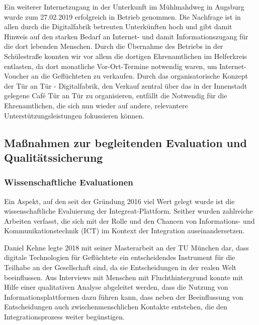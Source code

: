 \documentclass[12pt, a4paper]{article} %
\begin{document}
Ein weiterer Internetzugang in der Unterkunft im Mühlmahdweg in Augsburg
wurde zum 27.02.2019 erfolgreich in Betrieb genommen. Die Nachfrage ist
in allen durch die Digitalfabrik betreuten Unterkünften hoch und gibt
damit Hinweis auf den starken Bedarf an Internet- und damit
Informationszugang für die dort lebenden Menschen. Durch die Übernahme
des Betriebs in der Schülestraße konnten wir vor allem die dortigen
Ehrenamtlichen im Helferkreis entlasten, da dort monatliche
Vor-Ort-Termine notwendig waren, um Internet-Voucher an die Geflüchteten
zu verkaufen. Durch das organisatorische Konzept der Tür an Tür -
Digitalfabrik, den Verkauf zentral über das in der Innenstadt gelegene
Café Tür an Tür zu organisieren, entfällt die Notwendig für die
Ehrenamtlichen, die sich nun wieder auf andere, relevantere
Unterstützungsleistungen fokussieren können.

\hypertarget{mauxdfnahmen-zur-begleitenden-evaluation-und-qualituxe4tssicherung}{%
\subsection{Maßnahmen zur begleitenden Evaluation und
Qualitätssicherung}\label{mauxdfnahmen-zur-begleitenden-evaluation-und-qualituxe4tssicherung}}

\hypertarget{wissenschaftliche-evaluationen}{%
\subsubsection{Wissenschaftliche
Evaluationen}\label{wissenschaftliche-evaluationen}}

Ein Aspekt, auf den seit der Gründung 2016 viel Wert gelegt wurde ist
die wissenschaftliche Evaluierung der Integreat-Plattform. Seither
wurden zahlreiche Arbeiten verfasst, die sich mit der Rolle und den
Chancen von Informations- und Kommunikationstechnik (ICT) im Kontext der
Integration auseinandersetzen.

Daniel Kehne legte 2018 mit seiner Masterarbeit an der TU München dar,
dass digitale Technologien für Geflüchtete ein entscheidendes Instrument
für die Teilhabe an der Gesellschaft sind, da sie Entscheidungen in der
realen Welt beeinflussen. Aus Interviews mit Menschen mit
Fluchthintergrund konnte mit Hilfe einer qualitativen Analyse abgeleitet
werden, dass die Nutzung von Informationsplattformen dazu führen kann,
dass neben der Beeinflussung von Entscheidungen auch
zwischenmenschlichen Kontakte entstehen, die den Integrationsprozess
weiter begünstigen.
\end{document}

